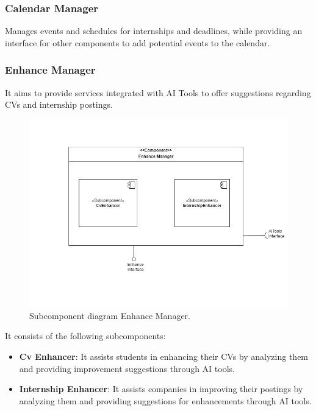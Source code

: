 \subsubsection{Calendar Manager} Manages events and schedules for internships and deadlines, while providing an interface for other components to add potential events to the calendar.

 
\subsubsection{Enhance Manager} It aims to provide services integrated with AI Tools to offer suggestions regarding CVs and internship postings.
 \begin{figure}[H]
    \centering
    \includegraphics[width=\linewidth]{DD/Images/Comp&Sub/EnhanceManager.png}
    \caption{Subcomponent diagram Enhance Manager.}
    \label{fig:enhance_manager}
    \end{figure}

It consists of the following subcomponents:
\begin{itemize}
    \item  \textbf{Cv Enhancer}: It assists students in enhancing their CVs by analyzing them and providing improvement suggestions through AI tools.
    \item  \textbf{Internship Enhancer}: It assists companies in improving their postings by analyzing them and providing suggestions for enhancements through AI tools.
    \end{itemize}
    

